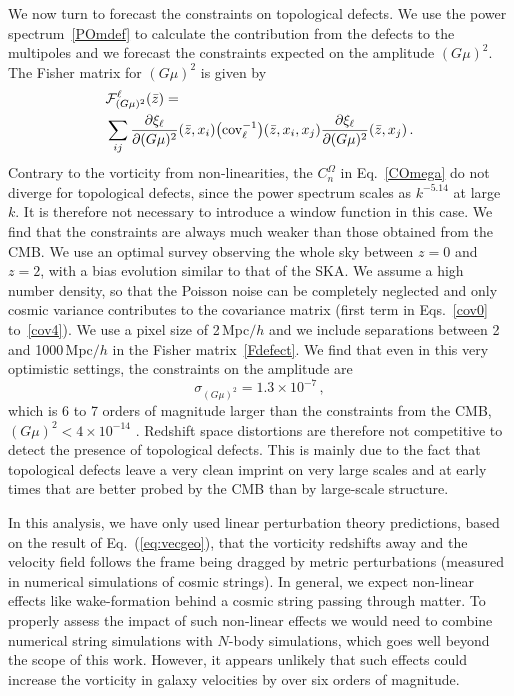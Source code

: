 \documentclass[a4paper,twocolumn,aps,prd,nolongbibliography,superscriptaddress,showpacs,showkeys,amsmath,amssymb,floatfix,nofootinbib]{revtex4-1}
\renewcommand{\[}{\begin{equation}}
\renewcommand{\]}{\end{equation}}
\begin{document}
We now turn to forecast the constraints on topological defects. We use the power spectrum~\eqref{POmdef} to calculate the contribution from the defects to the multipoles and we forecast the constraints expected on the amplitude $(G\mu)^2$. The Fisher matrix for $(G\mu)^2$ is given by
\begin{align}
&\mathcal{F}^\ell_{(G\mu)^2}(\bar z)=\label{Fdefect}\\
&\sum_{ij}\frac{\partial \xi_\ell}{\partial (G\mu)^2}(\bar z, x_i)\big({\rm cov_\ell^{-1}} \big)(\bar z, x_i,x_j)\frac{\partial \xi_\ell}{\partial(G\mu)^2}(\bar z, x_j)\, .\nonumber
\end{align}
Contrary to the vorticity from non-linearities, the $C_n^\Omega$ in Eq.~\eqref{COmega} do not diverge for topological defects, since the power spectrum scales as $k^{-5.14}$ at large $k$. It is therefore not necessary to introduce a window function in this case. We find that the constraints are always much weaker than those obtained from the CMB. We use an optimal survey observing the whole sky between $z=0$ and $z=2$, with a bias evolution similar to that of the SKA. We assume a high number density, so that the Poisson noise can be completely neglected and only cosmic variance contributes to the covariance matrix (first term in Eqs.~\eqref{cov0} to~\eqref{cov4}). We use a pixel size of 2\,Mpc$/h$ and we include separations between 2 and 1000\,Mpc$/h$ in the Fisher matrix~\eqref{Fdefect}. We find that even in this very optimistic settings, the constraints on the amplitude are
\[
\sigma_{(G\mu)^2}=1.3\times 10^{-7}\, ,
\]
which is 6 to 7 orders of magnitude larger than the constraints from the CMB, $(G\mu)^2 < 4 \times 10^{-14}$ \cite{Lizarraga:2016onn,Ade:2015xua}. Redshift space distortions are therefore not competitive to detect the presence of topological defects. This is mainly due to the fact that topological defects leave a very clean imprint on very large scales and at early times that are better probed by the CMB than by large-scale structure.

In this analysis, we have only used linear perturbation theory predictions, based on the result of Eq.\ (\ref{eq:vecgeo}), that the vorticity redshifts away and the velocity field follows the frame being dragged by  metric perturbations (measured in numerical simulations of cosmic strings). In general, we expect non-linear effects like wake-formation behind a cosmic string passing through matter. To properly assess the impact of such non-linear effects we would need to combine numerical string simulations with $N$-body simulations, which goes well beyond the scope of this work. However, it appears unlikely that such effects could increase the vorticity in galaxy velocities by over six orders of magnitude.
\end{document}
